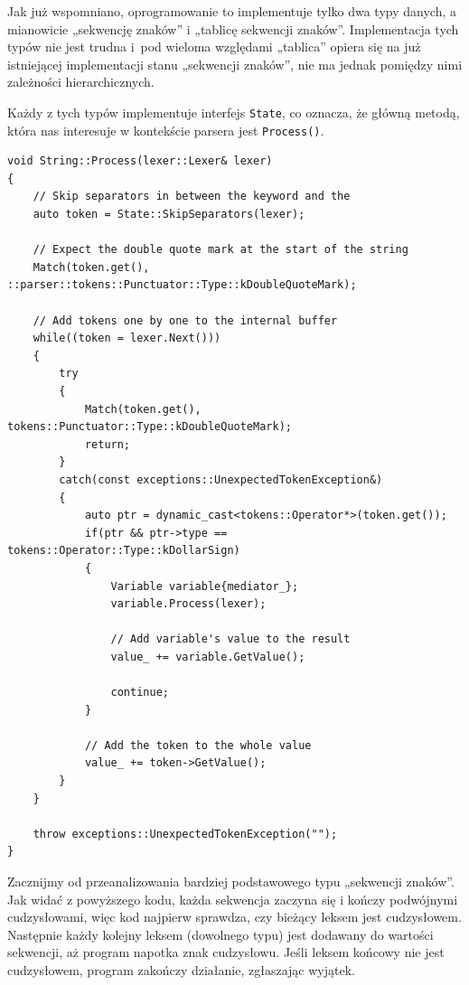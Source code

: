 Jak już wspomniano, oprogramowanie to implementuje tylko dwa typy danych, a mianowicie „sekwencję znaków” i „tablicę sekwencji znaków”. Implementacja tych typów nie jest trudna i~pod wieloma względami „tablica” opiera się na już istniejącej implementacji stanu „sekwencji znaków”, nie ma jednak pomiędzy nimi zależności hierarchicznych.

Każdy z tych typów implementuje interfejs \texttt{State}, co oznacza, że główną metodą, która nas interesuje w kontekście parsera jest \texttt{Process()}.

\begin{lstlisting}[label=list:string,caption=Metoda String::Process(),basicstyle=\footnotesize\ttfamily]
void String::Process(lexer::Lexer& lexer)
{
    // Skip separators in between the keyword and the
    auto token = State::SkipSeparators(lexer);

    // Expect the double quote mark at the start of the string
    Match(token.get(), ::parser::tokens::Punctuator::Type::kDoubleQuoteMark);
    
    // Add tokens one by one to the internal buffer
    while((token = lexer.Next()))
    {
        try
        {
            Match(token.get(), tokens::Punctuator::Type::kDoubleQuoteMark);
            return;
        }
        catch(const exceptions::UnexpectedTokenException&)
        {
            auto ptr = dynamic_cast<tokens::Operator*>(token.get());
            if(ptr && ptr->type == tokens::Operator::Type::kDollarSign)
            {
                Variable variable{mediator_};
                variable.Process(lexer);
    
                // Add variable's value to the result
                value_ += variable.GetValue();
    
                continue;
            }
    
            // Add the token to the whole value
            value_ += token->GetValue();
        }
    }
    
    throw exceptions::UnexpectedTokenException("");
}
\end{lstlisting}

Zacznijmy od przeanalizowania bardziej podstawowego typu „sekwencji znaków”. Jak widać z powyższego kodu, każda sekwencja zaczyna się i kończy podwójnymi cudzysłowami, więc kod najpierw sprawdza, czy bieżący leksem jest cudzysłowem. Następnie każdy kolejny leksem (dowolnego typu) jest dodawany do wartości sekwencji, aż program napotka znak cudzysłowu. Jeśli leksem końcowy nie jest cudzysłowem, program zakończy działanie, zgłaszając wyjątek.

